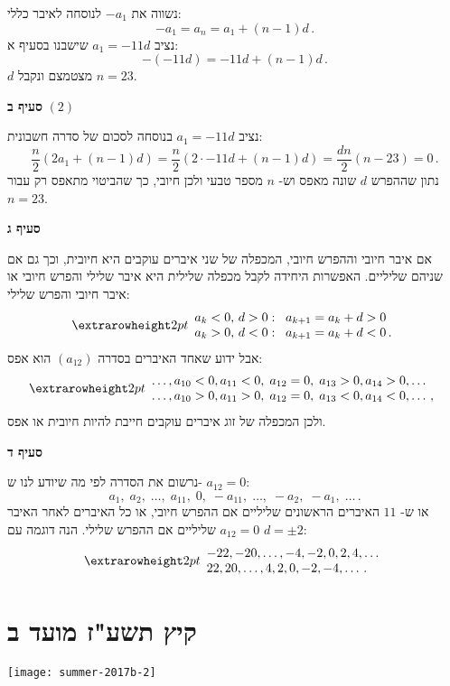נשווה את
$-a_1$
לנוסחה לאיבר כללי:
\[
-a_1 = a_n = a_1 + (n-1)d\,.
\]
נציב
$a_1=-11d$
שישבנו בסעיף א:
\[
-(-11d) = -11d + (n-1)d\,.
\]
$d$
מצטמצם ונקבל
$n=23$.

\smallskip

\textbf{סעיף ב}
$(2)$

נציב
$a_1=-11d$
 בנוסחה לסכום של סדרה חשבונית:
\[
\frac{n}{2}(2a_1+(n-1)d) = \frac{n}{2}(2\cdot -11d+(n-1)d) =\frac{dn}{2} (n-23)=0\,.
\]
נתון שההפרש 
$d$
שונה מאפס וש-%
$n$
מספר טבעי ולכן חיובי, כך שהביטוי מתאפס רק עבור
$n=23$.

\np

\textbf{סעיף ג}

אם איבר חיובי וההפרש חיובי, המכפלה של שני איברים עוקבים היא חיובית, וכך גם אם שניהם שליליים. האפשרות היחידה לקבל מכפלה שלילית היא איבר שלילי והפרש חיובי או איבר חיובי והפרש שלילי:
\[
\erh{2pt}
\begin{array}{l}
a_k<0,\,d>0:\;\; a_{k+1}=a_k+d>0\\
a_k>0,\, d<0:\;\; a_{k+1}=a_k+d<0\,.
\end{array}
\]
אבל ידוע שאחד האיברים בסדרה 
$(a_{12})$
הוא אפס:
\[
\erh{2pt}
\begin{array}{l}
\ldots, a_{10}<0, a_{11}<0,\; a_{12}=0,\; a_{13}>0, a_{14}>0,\ldots\\
\ldots, a_{10}>0, a_{11}>0,\; a_{12}=0,\; a_{13}<0, a_{14}<0,\ldots\,,
\end{array}
\]
ולכן המכפלה של זוג איברים עוקבים חייבת להיות חיובית או אפס.

\smallskip

\textbf{סעיף ד}

נרשום את הסדרה לפי מה שיודע לנו ש-%
$a_{12}=0$:
\[
a_1,\; a_2,\; \ldots,\; a_{11},\; 0,\; -a_{11},\; \ldots,\; -a_2,\; -a_1,\; \ldots\,.
\]
או ש-%
$11$
האיברים הראשונים שליליים אם ההפרש חיובי, או כל האיברים לאחר האיבר
$a_{12}=0$
שליליים אם ההפרש שלילי. הנה דוגמה עם
$d=\pm 2$:
\[
\erh{2pt}
\begin{array}{l}
-22, -20, \ldots, -4,-2,0,2,4,\ldots\\
22, 20, \ldots, 4,2,0,-2,-4,\ldots\,.
\end{array}
\]



\np
\section{קיץ תשע"ז מועד ב}

\begin{center}
\texttt{[image: summer-2017b-2]}
\end{center}

